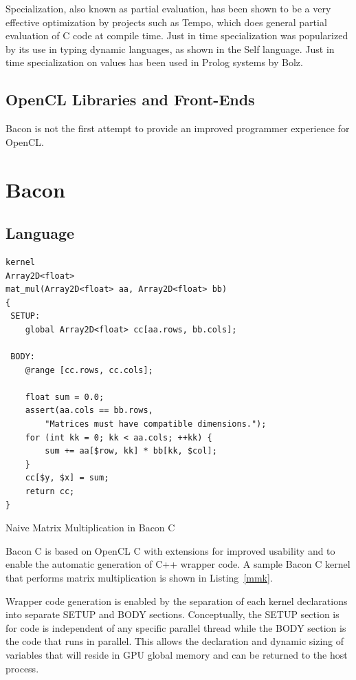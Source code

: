 \documentclass{llncs}
\begin{document}
Specialization, also known as partial evaluation, has been shown to be
a very effective optimization by projects such as
Tempo\cite{consel:1998}, which does general partial evaluation of C
code at compile time. Just in time specialization was popularized by
its use in typing dynamic languages, as shown in the Self
language\cite{chambers:1992}. Just in time specialization on values has
been used in Prolog systems by Bolz\cite{bolz:2010}.

\subsection{OpenCL Libraries and Front-Ends}

Bacon is not the first attempt to provide an improved programmer
experience for OpenCL. 

\section{Bacon}
\subsection{Language}

\begin{listing}[tb]
\begin{verbatim}
kernel
Array2D<float>
mat_mul(Array2D<float> aa, Array2D<float> bb) 
{
 SETUP:
    global Array2D<float> cc[aa.rows, bb.cols];

 BODY:
    @range [cc.rows, cc.cols];

    float sum = 0.0;
    assert(aa.cols == bb.rows, 
        "Matrices must have compatible dimensions.");
    for (int kk = 0; kk < aa.cols; ++kk) {
        sum += aa[$row, kk] * bb[kk, $col];
    }
    cc[$y, $x] = sum;
    return cc;
}
\end{verbatim}
\caption{Naive Matrix Multiplication in Bacon C}\label{mmk}
\end{listing}

Bacon C is based on OpenCL C with extensions for improved usability
and to enable the automatic generation of C++ wrapper code. A sample
Bacon C kernel that performs matrix multiplication is shown in
Listing~\ref{mmk}.

Wrapper code generation is enabled by the separation of each kernel
declarations into separate SETUP and BODY sections. Conceptually, the
SETUP section is for code is independent of any specific parallel
thread while the BODY section is the code that runs in parallel. This
allows the declaration and dynamic sizing of variables that will
reside in GPU global memory and can be returned to the host process.
\end{document}

